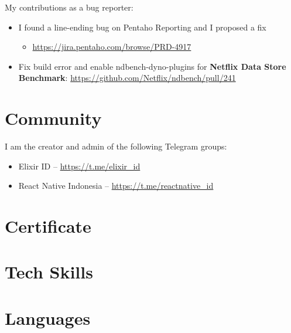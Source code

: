 \documentclass[11pt,a4paper,sans]{moderncv} %
\begin{document}
{
My contributions as a bug reporter:
\begin{itemize}
    \item I found a line-ending bug on Pentaho Reporting and I proposed a fix
    \begin{itemize}
        \item \url{https://jira.pentaho.com/browse/PRD-4917}
    \end{itemize}
    \item Fix build error and enable ndbench-dyno-plugins for \textbf{Netflix Data Store Benchmark}: \url{https://github.com/Netflix/ndbench/pull/241}
\end{itemize}
}

\section{Community}
\cvitem{}
{
I am the creator and admin of the following Telegram groups:
\begin{itemize}
    \item Elixir ID -- \url{https://t.me/elixir\_id}
    \item React Native Indonesia -- \url{https://t.me/reactnative\_id}
\end{itemize}
}

\section{Certificate}


\section{Tech Skills}




\section{Languages}
\begin{small}
\end{small}
\end{document}
